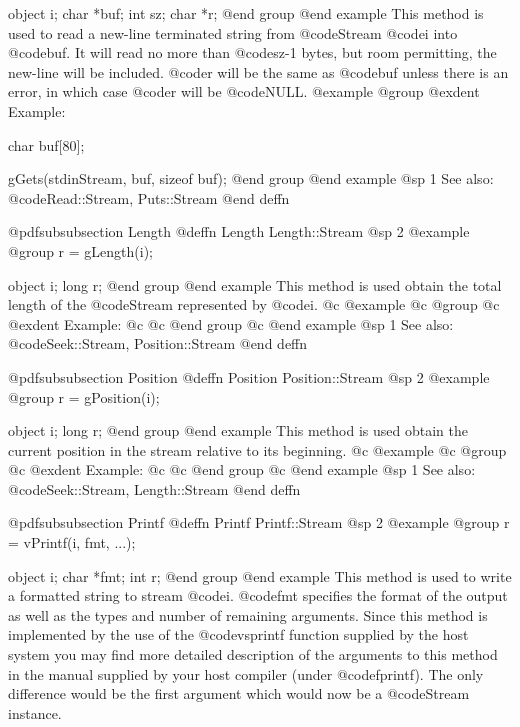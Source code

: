 object  i;
char    *buf;
int     sz;
char    *r;
@end group
@end example
This method is used to read a new-line terminated string from
@code{Stream} @code{i} into @code{buf}.  It will read no more than
@code{sz-1} bytes, but room permitting, the new-line will be included.
@code{r} will be the same as @code{buf} unless there is an error, in
which case @code{r} will be @code{NULL}.
@example
@group
@exdent Example:
  
char    buf[80];

gGets(stdinStream, buf, sizeof buf);
@end group
@end example
@sp 1
See also:  @code{Read::Stream, Puts::Stream}
@end deffn







@pdfsubsubsection {Length}
@deffn {Length} Length::Stream
@sp 2
@example
@group
r = gLength(i);

object  i;
long    r;
@end group
@end example
This method is used obtain the total length of the @code{Stream} represented
by @code{i}.
@c @example
@c @group
@c @exdent Example:
@c  
@c @end group
@c @end example
@sp 1
See also:  @code{Seek::Stream, Position::Stream}
@end deffn









@pdfsubsubsection {Position}
@deffn {Position} Position::Stream
@sp 2
@example
@group
r = gPosition(i);

object  i;
long    r;
@end group
@end example
This method is used obtain the current position in the stream
relative to its beginning.
@c @example
@c @group
@c @exdent Example:
@c  
@c @end group
@c @end example
@sp 1
See also:  @code{Seek::Stream, Length::Stream}
@end deffn








@pdfsubsubsection {Printf}
@deffn {Printf} Printf::Stream
@sp 2
@example
@group
r = vPrintf(i, fmt, ...);

object  i;
char    *fmt;
int     r;
@end group
@end example
This method is used to write a formatted string to stream @code{i}.
@code{fmt} specifies the format of the output as well as the types and
number of remaining arguments.  Since this method is implemented by the
use of the @code{vsprintf} function supplied by the host system you may
find more detailed description of the arguments to this method in the
manual supplied by your host compiler (under @code{fprintf}).  The only
difference would be the first argument which would now be a @code{Stream}
instance.

